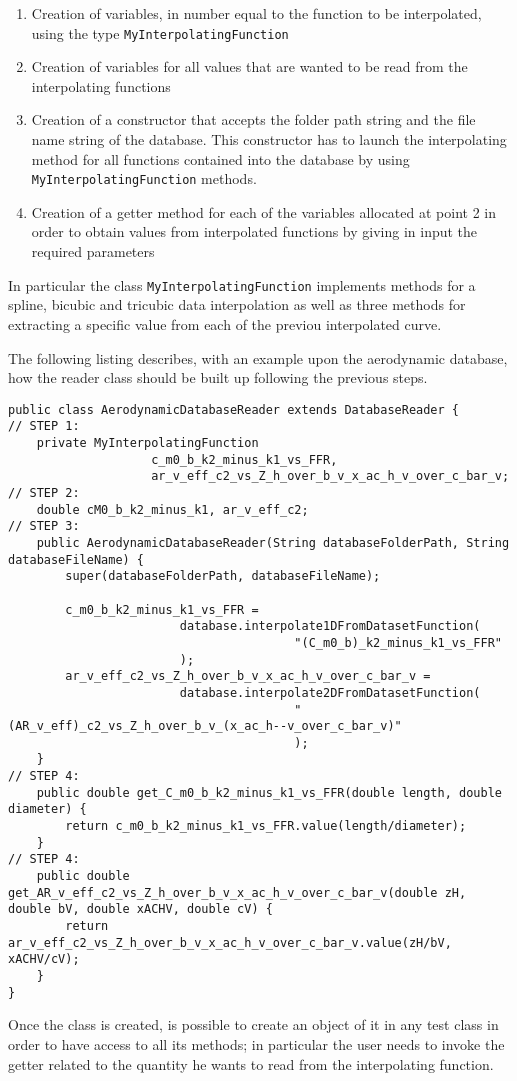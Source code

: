 \begin{enumerate}
\item Creation of variables, in number equal to the function to be interpolated, using the type \lstinline[language=Java]!MyInterpolatingFunction! 
\item Creation of variables for all values that are wanted to be read from the interpolating functions
\item Creation of a constructor that accepts the folder path string and the file name string of the database. This constructor has to launch the interpolating method for all functions contained into the database by using  \lstinline[language=Java]!MyInterpolatingFunction! methods.
\item Creation of a getter method for each of the variables allocated at point 2 in order to obtain values from interpolated functions by giving in input the required parameters
\end{enumerate}

\noindent
In particular the class \lstinline[language=Java]!MyInterpolatingFunction! implements methods for a spline, bicubic and tricubic data interpolation as well as three methods for extracting a specific value from each of the previou interpolated curve.

\bigskip
\noindent
The following listing describes, with an example upon the aerodynamic database, how the reader class should be built up following the previous steps.

\lstset{language=Java}
\begin{lstlisting}[caption={DatabaseReader son class creation}, captionpos=t, tabsize=2]
public class AerodynamicDatabaseReader extends DatabaseReader {
// STEP 1:
	private MyInterpolatingFunction 
					c_m0_b_k2_minus_k1_vs_FFR,
					ar_v_eff_c2_vs_Z_h_over_b_v_x_ac_h_v_over_c_bar_v;
// STEP 2:
	double cM0_b_k2_minus_k1, ar_v_eff_c2;
// STEP 3:
	public AerodynamicDatabaseReader(String databaseFolderPath, String databaseFileName) {
		super(databaseFolderPath, databaseFileName);

		c_m0_b_k2_minus_k1_vs_FFR = 
						database.interpolate1DFromDatasetFunction(
										"(C_m0_b)_k2_minus_k1_vs_FFR"
						);
		ar_v_eff_c2_vs_Z_h_over_b_v_x_ac_h_v_over_c_bar_v =
						database.interpolate2DFromDatasetFunction(
										"(AR_v_eff)_c2_vs_Z_h_over_b_v_(x_ac_h--v_over_c_bar_v)"
										);
	}
// STEP 4:	
	public double get_C_m0_b_k2_minus_k1_vs_FFR(double length, double diameter) { 
		return c_m0_b_k2_minus_k1_vs_FFR.value(length/diameter);
	}
// STEP 4:
	public double get_AR_v_eff_c2_vs_Z_h_over_b_v_x_ac_h_v_over_c_bar_v(double zH, double bV, double xACHV, double cV) {
		return ar_v_eff_c2_vs_Z_h_over_b_v_x_ac_h_v_over_c_bar_v.value(zH/bV, xACHV/cV);
	}
}
\end{lstlisting}

\bigskip
\noindent
Once the class is created, is possible to create an object of it in any test class in order to have access to all its methods; in particular the user needs to invoke the getter related to the quantity he wants to read from the interpolating function. 